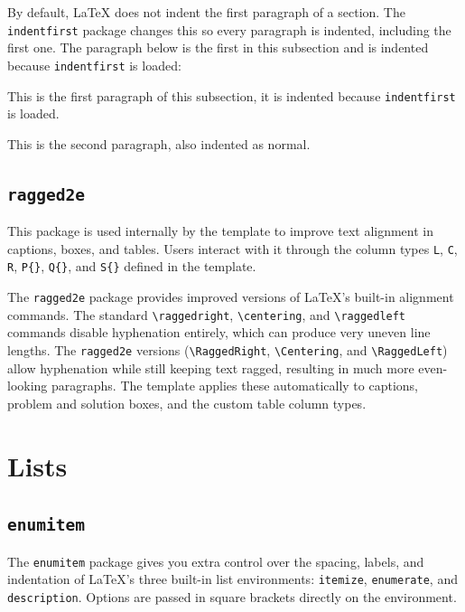 	By default, \LaTeX{} does not indent the first paragraph of a section. The \texttt{indentfirst} package changes this so every paragraph is indented, including the first one. The paragraph below is the first in this subsection and is indented because \texttt{indentfirst} is loaded:
	
	This is the first paragraph of this subsection, it is indented because \texttt{indentfirst} is loaded.
	
	This is the second paragraph, also indented as normal.
	
	\subsection{\texttt{ragged2e}}
	\noindent\colorbox{themecolour!15}{\parbox{\linewidth}{\small This package is used internally by the template to improve text alignment in captions, boxes, and tables. Users interact with it through the column types \texttt{L}, \texttt{C}, \texttt{R}, \texttt{P\{\}}, \texttt{Q\{\}}, and \texttt{S\{\}} defined in the template.}}\vspace{0.5\baselineskip}
	
	The \texttt{ragged2e} package provides improved versions of \LaTeX{}'s built-in alignment commands. The standard \texttt{\textbackslash raggedright}, \texttt{\textbackslash centering}, and \texttt{\textbackslash raggedleft} commands disable hyphenation entirely, which can produce very uneven line lengths. The \texttt{ragged2e} versions (\texttt{\textbackslash RaggedRight}, \texttt{\textbackslash Centering}, and \texttt{\textbackslash RaggedLeft}) allow hyphenation while still keeping text ragged, resulting in much more even-looking paragraphs. The template applies these automatically to captions, problem and solution boxes, and the custom table column types.

\section{Lists}\label{sec:lists}

	\subsection{\texttt{enumitem}}
	The \texttt{enumitem} package gives you extra control over the spacing, labels, and indentation of \LaTeX's three built-in list environments: \texttt{itemize}, \texttt{enumerate}, and \texttt{description}. Options are passed in square brackets directly on the environment.
	

